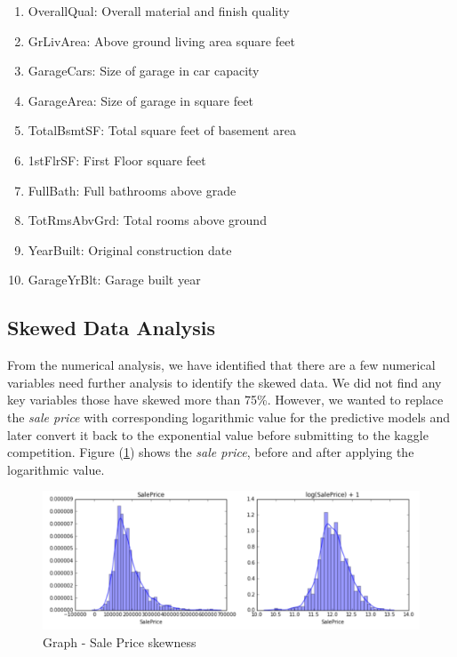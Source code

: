 \documentclass[sigconf]{acmart}
\begin{document}
	\begin{enumerate}
		\item OverallQual: Overall material and finish quality
		\item GrLivArea: Above ground living area square feet
		\item GarageCars: Size of garage in car capacity
		\item GarageArea: Size of garage in square feet
		\item TotalBsmtSF: Total square feet of basement area
		\item 1stFlrSF: First Floor square feet
		\item FullBath: Full bathrooms above grade
		\item TotRmsAbvGrd: Total rooms above ground
		\item YearBuilt: Original construction date
		\item GarageYrBlt: Garage built year		
	\end{enumerate}

	\subsection{Skewed Data Analysis}
	From the numerical analysis, we have identified that there are a few numerical variables need further analysis to identify the skewed data. We did not find any key variables those have skewed more than 75\%. However, we wanted to replace the {\em sale price} with corresponding logarithmic value for the predictive models and later convert it back to the exponential value before submitting to the kaggle competition. Figure (\ref{fig:sale-price-skew}) shows the {\em sale price}, before and after applying the logarithmic value. 
	
	\begin{figure}[htb]
		\centering
		\includegraphics[width=1.0\columnwidth]{images/sale_price_skew}	
		\caption{Graph - Sale Price skewness} \label{fig:sale-price-skew} 
	\end{figure}
\end{document}
